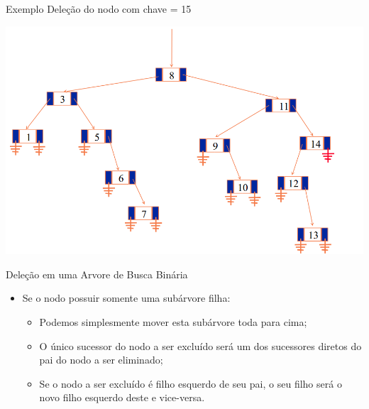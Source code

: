 \documentclass[12pt,table,xcolor={dvipsnames}]{beamer}
\begin{document}
\begin{frame}[fragile]{Exemplo}
Deleção do nodo com chave = 15
\begin{center}
\includegraphics[scale=.3]{arv9.png} 
\end{center}
\end{frame}

\begin{frame}[fragile]{Deleção em uma Arvore de Busca Binária}
          \begin{itemize}
          \item Se o nodo possuir somente uma subárvore filha:
		  \begin{itemize}
		  \item Podemos simplesmente mover esta subárvore toda para cima;
		  \item O único sucessor do nodo a ser excluído será um dos sucessores diretos do pai do nodo a ser eliminado;
		  \item Se o nodo a ser excluído é filho esquerdo de seu pai, o seu filho será o novo filho esquerdo deste e vice-versa.
		  \end{itemize}
       	  \end{itemize}
\end{frame}
\end{document}
